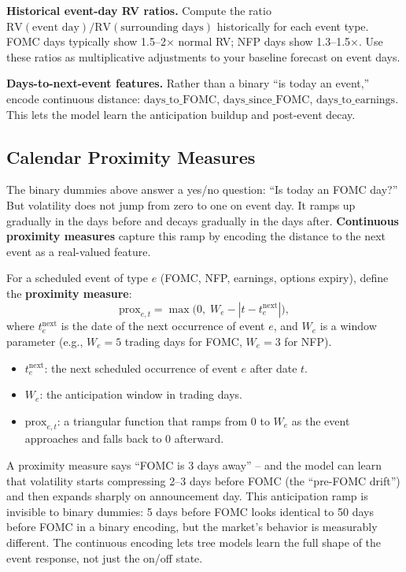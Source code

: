 \textbf{Historical event-day RV ratios.}
Compute the ratio $\text{RV}(\text{event day}) / \text{RV}(\text{surrounding days})$ historically for each event type.
FOMC days typically show 1.5--2$\times$ normal RV; NFP days show 1.3--1.5$\times$.
Use these ratios as multiplicative adjustments to your baseline forecast on event days.

\textbf{Days-to-next-event features.}
Rather than a binary ``is today an event,'' encode continuous distance: $\text{days\_to\_FOMC}$, $\text{days\_since\_FOMC}$, $\text{days\_to\_earnings}$.
This lets the model learn the anticipation buildup and post-event decay.

\subsection{Calendar Proximity Measures}\label{sec:feat-proximity}

The binary dummies above answer a yes/no question: ``Is today an FOMC day?''
But volatility does not jump from zero to one on event day.
It ramps up gradually in the days before and decays gradually in the days after.
\textbf{Continuous proximity measures} capture this ramp by encoding the distance to the next event as a real-valued feature.

\begin{definition}
For a scheduled event of type $e$ (FOMC, NFP, earnings, options expiry), define the \textbf{proximity measure}:
\begin{equation}\label{eq:proximity}
\text{prox}_{e,t} = \max\!\bigl(0,\; W_e - |t - t_e^{\text{next}}|\bigr),
\end{equation}
where $t_e^{\text{next}}$ is the date of the next occurrence of event $e$, and $W_e$ is a window parameter (e.g., $W_e = 5$ trading days for FOMC, $W_e = 3$ for NFP).
\end{definition}

\begin{itemize}[nosep]
  \item $t_e^{\text{next}}$: the next scheduled occurrence of event $e$ after date $t$.
  \item $W_e$: the anticipation window in trading days.
  \item $\text{prox}_{e,t}$: a triangular function that ramps from 0 to $W_e$ as the event approaches and falls back to 0 afterward.
\end{itemize}

\begin{intuition}
A proximity measure says ``FOMC is 3 days away'' -- and the model can learn that volatility starts compressing 2--3 days before FOMC (the ``pre-FOMC drift'') and then expands sharply on announcement day.
This anticipation ramp is invisible to binary dummies: 5 days before FOMC looks identical to 50 days before FOMC in a binary encoding, but the market's behavior is measurably different.
The continuous encoding lets tree models learn the full shape of the event response, not just the on/off state.
\end{intuition}

